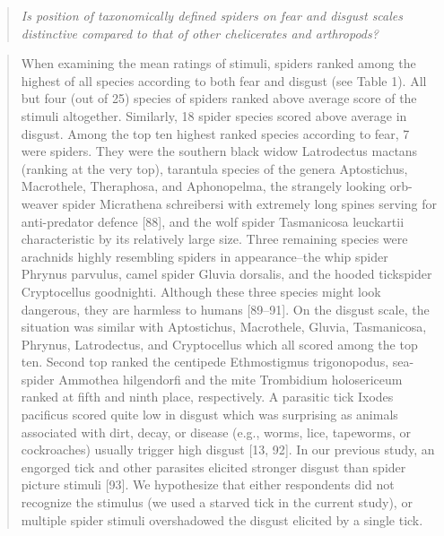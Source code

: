 \documentclass[
]{book}
\begin{document}
\begin{quote}
\emph{Is position of taxonomically defined spiders on fear and disgust scales distinctive compared to that of other chelicerates and arthropods?}
\end{quote}

\begin{quote}
When examining the mean ratings of stimuli, spiders ranked among the highest of all species according to both fear and disgust (see Table 1). All but four (out of 25) species of spiders ranked above average score of the stimuli altogether. Similarly, 18 spider species scored above average in disgust. Among the top ten highest ranked species according to fear, 7 were spiders. They were the southern black widow Latrodectus mactans (ranking at the very top), tarantula species of the genera Aptostichus, Macrothele, Theraphosa, and Aphonopelma, the strangely looking orb-weaver spider Micrathena schreibersi with extremely long spines serving for anti-predator defence {[}88{]}, and the wolf spider Tasmanicosa leuckartii characteristic by its relatively large size. Three remaining species were arachnids highly resembling spiders in appearance--the whip spider Phrynus parvulus, camel spider Gluvia dorsalis, and the hooded tickspider Cryptocellus goodnighti. Although these three species might look dangerous, they are harmless to humans {[}89--91{]}. On the disgust scale, the situation was similar with Aptostichus, Macrothele, Gluvia, Tasmanicosa, Phrynus, Latrodectus, and Cryptocellus which all scored among the top ten. Second top ranked the centipede Ethmostigmus trigonopodus, sea-spider Ammothea hilgendorfi and the mite Trombidium holosericeum ranked at fifth and ninth place, respectively. A parasitic tick Ixodes pacificus scored quite low in disgust which was surprising as animals associated with dirt, decay, or disease (e.g., worms, lice, tapeworms, or cockroaches) usually trigger high disgust {[}13, 92{]}. In our previous study, an engorged tick and other parasites elicited stronger disgust than spider picture stimuli {[}93{]}. We hypothesize that either respondents did not recognize the stimulus (we used a starved tick in the current study), or multiple spider stimuli overshadowed the disgust elicited by a single tick.
\end{quote}
\end{document}
